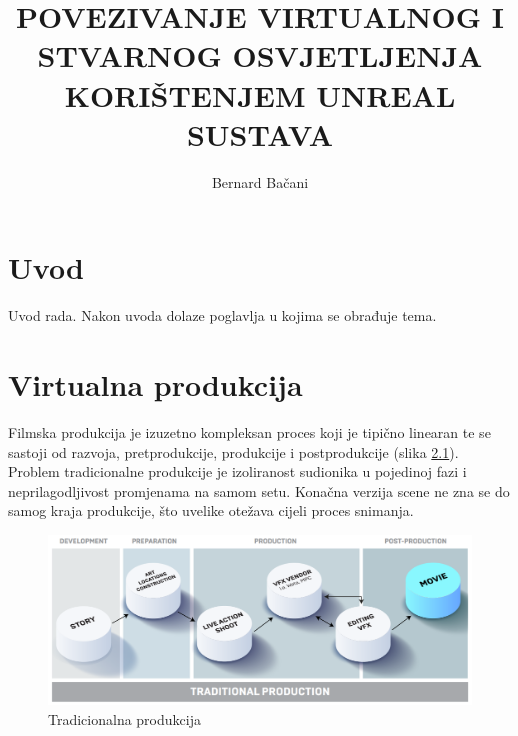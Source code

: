 \documentclass[times, utf8, zavrsni, numeric]{fer}
\begin{document}

\title{POVEZIVANJE VIRTUALNOG I STVARNOG OSVJETLJENJA KORIŠTENJEM UNREAL SUSTAVA}

\author{Bernard Bačani}

\maketitle

\izvornik


\tableofcontents

\chapter{Uvod}
Uvod rada. Nakon uvoda dolaze poglavlja u kojima se obrađuje tema.

\chapter{Virtualna produkcija}
Filmska produkcija je izuzetno kompleksan proces koji je tipično linearan te se sastoji od razvoja, pretprodukcije, produkcije i postprodukcije (slika \ref{fig:slika 2-1}). Problem tradicionalne produkcije je izoliranost sudionika u pojedinoj fazi i neprilagodljivost promjenama na samom setu. Konačna verzija scene ne zna se do samog kraja produkcije, što uvelike otežava cijeli proces snimanja.\newline

\begin{figure}[htp]
	\centering
	\includegraphics[width=\linewidth]{slika 2-1.png}
	\caption{Tradicionalna produkcija \cite{vpguide1}}
	\label{fig:slika 2-1}
\end{figure}
\end{document}
